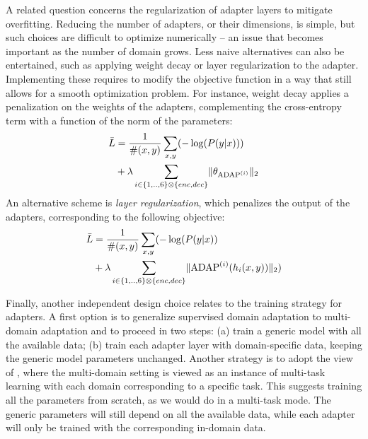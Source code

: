 \documentclass[11pt,a4paper]{article}
\newcommand{\fyDone}[1]{\done[FY]\Todo[FY:]{\textcolor{orange}{#1}}}
\newcommand{\fyFuture}[1]{\done[FY]\Todo[FY:]{\textcolor{red}{#1}}}
\begin{document}
A related question concerns the regularization of adapter layers to mitigate overfitting. Reducing the number of adapters, or their dimensions, is simple, but such choices are difficult to optimize numerically -- an issue that becomes important as the number of domain grows. Less naive alternatives can also be entertained, such as applying weight decay or layer regularization to the adapter. Implementing these requires to modify the objective function in a way that still allows for a smooth optimization problem. For instance, weight decay applies a penalization on the weights of the adapters, complementing the cross-entropy term with a function of the norm of the parameters: \fyDone{The second summation also runs over $x,y$ ? I think not}
\begin{equation*}
  \begin{split}
    \bar{L} & = \frac{1}{\#(x,y)}\mathop{\sum}_{x,y}( - \log(P(y|x))) \\
    & + \lambda  \sum_{i \in \{1,..,6\} \otimes \{enc, dec\}} \normL{\theta_{\operatorname{ADAP}^{(i)}}}
  \end{split}
\end{equation*}
An alternative scheme is \emph{layer regularization}, which penalizes the output of the adapters, corresponding to the following objective:
\begin{equation*}
  \begin{split}
    \bar{L} & = \frac{1}{\#(x,y)}\mathop{\sum}_{x,y} (-\log(P(y|x)) \\
    & + \lambda \sum_{i \in \{1,..,6\} \otimes \{enc, dec\}} \normL{\operatorname{ADAP}^{(i)}(h_i(x,y))})
  \end{split}
\end{equation*}

Finally, another independent design choice relates to the training strategy for adapters. A first option is to generalize supervised domain adaptation to multi-domain adaptation and to proceed in two steps: (a) train a generic model with all the available data; (b) train each adapter layer with domain-specific data, keeping the generic model parameters unchanged. Another strategy is to adopt the view of \citet{Dredze08online}, where the multi-domain setting is viewed as an instance of multi-task learning \cite{Caruana97multitask} with each domain corresponding to a specific task. This suggests training all the parameters from scratch, as we would do in a multi-task mode. The generic parameters will still depend on all the available data, while each adapter will only be trained with the corresponding in-domain data.\fyFuture{Does everyone need a domain? Do we need this discussion - talk about sentence-level adaptation, better classifier pour MDL}
\end{document}
